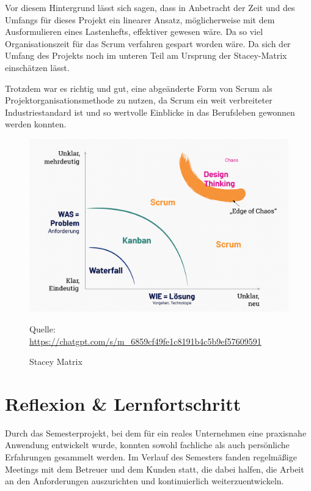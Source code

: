 \documentclass[a4paper,12pt]{article}
\begin{document}
Vor diesem Hintergrund lässt sich sagen, dass in Anbetracht der Zeit und des Umfangs für dieses Projekt ein linearer Ansatz, möglicherweise mit dem Ausformulieren eines Lastenhefts, effektiver gewesen wäre. Da so viel Organisationszeit für das Scrum verfahren gespart worden wäre. Da sich der Umfang des Projekts noch im unteren Teil am Ursprung der Stacey-Matrix einschätzen lässt.

Trotzdem war es richtig und gut, eine abgeänderte Form von Scrum als Projektorganisationsmethode zu nutzen, da Scrum ein weit verbreiteter Industriestandard ist und so wertvolle Einblicke in das Berufsleben gewonnen werden konnten.

\begin{figure}[H]
    \centering
    \includegraphics[width=1\textwidth]{Abbildungen/stacey_matrix.png}
    \caption{Stacey Matrix}
    \label{fig:stacey_matrix}
    \vspace{1mm}
    {\small Quelle: \url{https://chatgpt.com/s/m_6859cf49fe1c8191b4c5b9ef57609591}}
\end{figure}


\newpage


\section{Reflexion \& Lernfortschritt}

Durch das Semesterprojekt, bei dem für ein reales Unternehmen eine praxisnahe Anwendung entwickelt wurde, konnten sowohl fachliche als auch persönliche Erfahrungen gesammelt werden. Im Verlauf des Semesters fanden regelmäßige Meetings mit dem Betreuer und dem Kunden statt, die dabei halfen, die Arbeit an den Anforderungen auszurichten und kontinuierlich weiterzuentwickeln.
\end{document}
